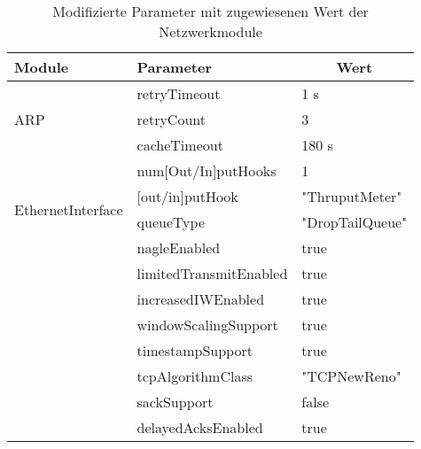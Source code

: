 \begin{table}[ht]
	\centering
	\begin{tabularx}{\textwidth}{|l|X|l|}
		\hline
		\rowcolor{Gainsboro!60}
		\textbf{Module}                    & \textbf{Parameter}     & \multicolumn{1}{c|}{\textbf{Wert}} \\ \hline
		\multirow{3}{*}{ARP}               & retryTimeout           & 1 s                                 \\ \cline{2-3}
		                                   & retryCount             & 3                                  \\ \cline{2-3}
		                                   & cacheTimeout           & 180 s                               \\ \hline
		\multirow{4}{*}{EthernetInterface} & num[Out/In]putHooks    & 1                                  \\ \cline{2-3}
		                                   & [out/in]putHook        & "ThruputMeter"                     \\ \cline{2-3}
		                                   & queueType              & "DropTailQueue"                    \\ \hline
		\multirow{8}{*}{TCP}               & nagleEnabled           & true                               \\ \cline{2-3}
		                                   & limitedTransmitEnabled & true                               \\ \cline{2-3}
		                                   & increasedIWEnabled     & true                               \\ \cline{2-3}
		                                   & windowScalingSupport   & true                               \\ \cline{2-3}
		                                   & timestampSupport       & true                               \\ \cline{2-3}
		                                   & tcpAlgorithmClass      & "TCPNewReno"                      \\ \cline{2-3}
		                                   & sackSupport            & false                               \\ \cline{2-3}
		                                   & delayedAcksEnabled     & true                               \\ \hline
	\end{tabularx}
	\caption{Modifizierte Parameter mit zugewiesenen Wert der Netzwerkmodule}
	\label{tab:modifiedModuleParameters}
\end{table}

